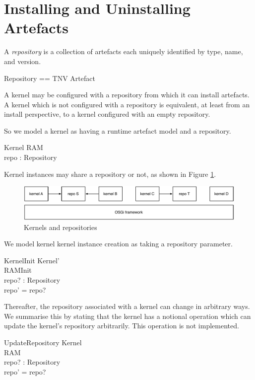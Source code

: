 \documentclass[a4paper,12pt]{article}
\begin{document}
\clearpage
\section{Installing and Uninstalling Artefacts}

A \textit{repository} is a collection of artefacts each uniquely identified by type, name, and version.
\begin{zed}
Repository == TNV \pinj Artefact
\end{zed}

A kernel may be configured with a repository from which it can install artefacts.
A kernel which is not configured with a repository is equivalent, at least from an install perspective, to
a kernel configured with an empty repository.

So we model a kernel as having a runtime artefact model and a repository.
\begin{schema}{Kernel}
RAM \\
repo : Repository \\
\end{schema}

Kernel instances may share a repository or not, as shown in Figure \ref{fig:kernel-repos}.
\begin{figure}[h!]
\includegraphics*[scale=0.7]{kernel-repos.pdf}
\caption{Kernels and repositories}
\label{fig:kernel-repos}
\end{figure}

We model kernel kernel instance creation as taking a repository parameter.
\begin{schema}{KernelInit}
Kernel' \\
RAMInit \\
repo? : Repository \\
\where
repo' = repo? \\
\end{schema}

Thereafter, the repository associated with a kernel can change in arbitrary ways.
We summarise this by stating that the kernel has a notional operation which can update
the kernel's repository arbitrarily. This operation is not implemented.
\begin{schema}{UpdateRepository}
\Delta Kernel \\
\Xi RAM \\
repo? : Repository \\
\where
repo' = repo? \\
\end{schema}
\end{document}
